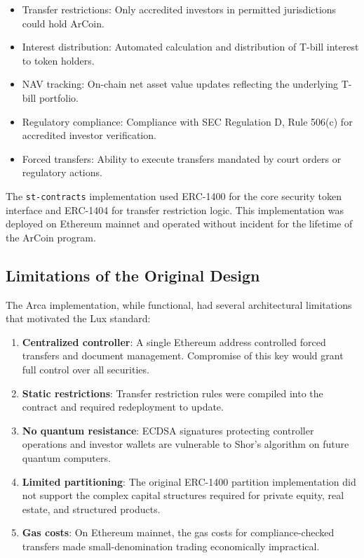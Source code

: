 \documentclass[11pt,a4paper]{article}
\begin{document}
\begin{itemize}[nosep]
  \item Transfer restrictions: Only accredited investors in permitted jurisdictions could hold ArCoin.
  \item Interest distribution: Automated calculation and distribution of T-bill interest to token holders.
  \item NAV tracking: On-chain net asset value updates reflecting the underlying T-bill portfolio.
  \item Regulatory compliance: Compliance with SEC Regulation D, Rule 506(c) for accredited investor verification.
  \item Forced transfers: Ability to execute transfers mandated by court orders or regulatory actions.
\end{itemize}

The \texttt{st-contracts} implementation used ERC-1400 for the core security token interface and ERC-1404 for transfer restriction logic. This implementation was deployed on Ethereum mainnet and operated without incident for the lifetime of the ArCoin program.

\subsection{Limitations of the Original Design}

The Arca implementation, while functional, had several architectural limitations that motivated the Lux standard:

\begin{enumerate}[nosep]
  \item \textbf{Centralized controller}: A single Ethereum address controlled forced transfers and document management. Compromise of this key would grant full control over all securities.
  \item \textbf{Static restrictions}: Transfer restriction rules were compiled into the contract and required redeployment to update.
  \item \textbf{No quantum resistance}: ECDSA signatures protecting controller operations and investor wallets are vulnerable to Shor's algorithm on future quantum computers.
  \item \textbf{Limited partitioning}: The original ERC-1400 partition implementation did not support the complex capital structures required for private equity, real estate, and structured products.
  \item \textbf{Gas costs}: On Ethereum mainnet, the gas costs for compliance-checked transfers made small-denomination trading economically impractical.
\end{enumerate}
\end{document}
